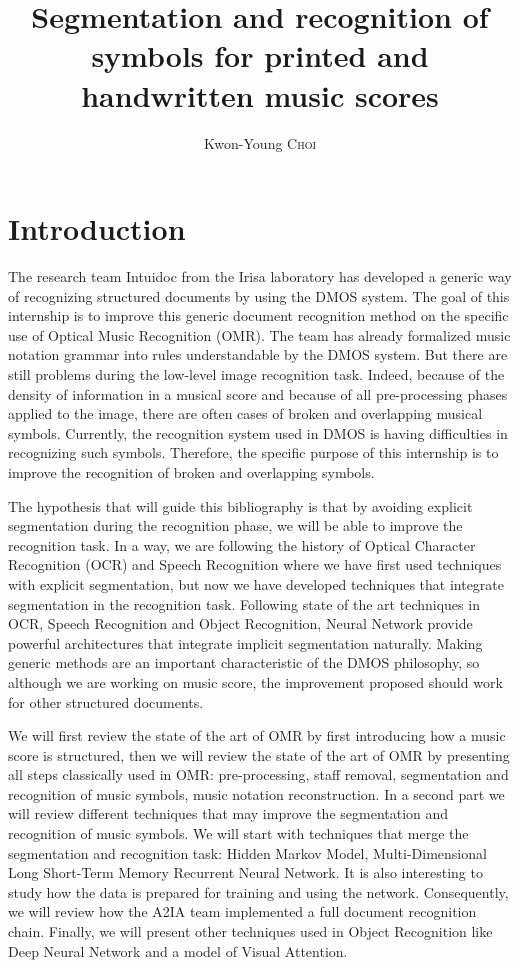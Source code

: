 \documentclass[11pt]{sdm}
\title{Segmentation and recognition of symbols for printed and handwritten music scores}
\author{Kwon-Young \textsc{Choi}}
\begin{document}
\maketitle


\section{Introduction}

The research team Intuidoc from the Irisa laboratory has developed a generic way of recognizing structured documents by using the DMOS system.
The goal of this internship is to improve this generic document recognition method on the specific use of Optical Music Recognition (OMR).
The team has already formalized music notation grammar into rules understandable by the DMOS system.
But there are still problems during the low-level image recognition task.
Indeed, because of the density of information in a musical score and because of all pre-processing phases applied to the image, there are often cases of broken and overlapping musical symbols.
Currently, the recognition system used in DMOS is having difficulties in recognizing such symbols.
Therefore, the specific purpose of this internship is to improve the recognition of broken and overlapping symbols.

The hypothesis that will guide this bibliography is that by avoiding explicit segmentation during the recognition phase, we will be able to improve the recognition task.
In a way, we are following the history of Optical Character Recognition (OCR) and Speech Recognition where we have first used techniques with explicit segmentation, but now we have developed techniques that integrate segmentation in the recognition task.
Following state of the art techniques in OCR, Speech Recognition and Object Recognition, Neural Network provide powerful architectures that integrate implicit segmentation naturally.
Making generic methods are an important characteristic of the DMOS philosophy, so although we are working on music score, the improvement proposed should work for other structured documents.

We will first review the state of the art of OMR by first introducing how a music score is structured, then we will review the state of the art of OMR by presenting all steps classically used in OMR: pre-processing, staff removal, segmentation and recognition of music symbols, music notation reconstruction.
In a second part we will review different techniques that may improve the segmentation and recognition of music symbols.
We will start with techniques that merge the segmentation and recognition task: Hidden Markov Model, Multi-Dimensional Long Short-Term Memory Recurrent Neural Network.
It is also interesting to study how the data is prepared for training and using the network.
Consequently, we will review how the A2IA team implemented a full document recognition chain.
Finally, we will present other techniques used in Object Recognition like Deep Neural Network and a model of Visual Attention.
\end{document}
